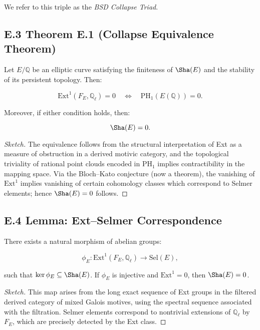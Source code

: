We refer to this triple as the \emph{BSD Collapse Triad}.

\subsection*{E.3 Theorem E.1 (Collapse Equivalence Theorem)}

\begin{theorem}
Let \( E/\mathbb{Q} \) be an elliptic curve satisfying the finiteness of \( \Sha(E) \) and the stability of its persistent topology. Then:

\[
\mathrm{Ext}^1(F_E, \mathbb{Q}_\ell) = 0 \quad \Longleftrightarrow \quad \mathrm{PH}_1(E(\mathbb{Q})) = 0.
\]

Moreover, if either condition holds, then:

\[
\Sha(E) = 0.
\]
\end{theorem}

\begin{proof}[Sketch]
The equivalence follows from the structural interpretation of Ext as a measure of obstruction in a derived motivic category,  
and the topological triviality of rational point clouds encoded in \( \mathrm{PH}_1 \) implies contractibility in the mapping space.  
Via the Bloch--Kato conjecture (now a theorem), the vanishing of \( \mathrm{Ext}^1 \) implies vanishing of certain cohomology classes  
which correspond to Selmer elements; hence \( \Sha(E) = 0 \) follows.
\end{proof}

\subsection*{E.4 Lemma: Ext--Selmer Correspondence}

\begin{lemma}
There exists a natural morphism of abelian groups:

\[
\phi_E : \mathrm{Ext}^1(F_E, \mathbb{Q}_\ell) \longrightarrow \mathrm{Sel}(E),
\]

such that \( \ker \phi_E \subseteq \Sha(E) \). If \( \phi_E \) is injective and \( \mathrm{Ext}^1 = 0 \), then \( \Sha(E) = 0 \).
\end{lemma}

\begin{proof}[Sketch]
This map arises from the long exact sequence of Ext groups in the filtered derived category of mixed Galois motives,  
using the spectral sequence associated with the filtration. Selmer elements correspond to nontrivial extensions of \( \mathbb{Q}_\ell \) by \( F_E \),  
which are precisely detected by the Ext class.
\end{proof}

